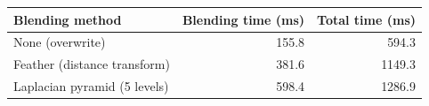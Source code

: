 \begin{tabular}{lrr}
\toprule
Blending method & Blending time (ms) & Total time (ms) \\
\midrule
None (overwrite) & 155.8 & 594.3 \\
Feather (distance transform) & 381.6 & 1149.3 \\
Laplacian pyramid (5 levels) & 598.4 & 1286.9 \\
\bottomrule
\end{tabular}
